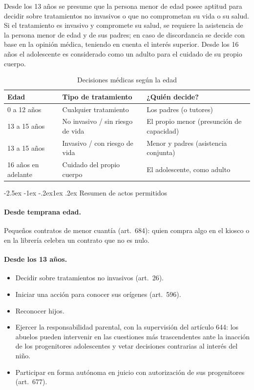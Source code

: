 \documentclass[12pt,oneside]{book}
\makeatletter
\renewcommand\subsection{\@startsection{subsection}{2}{\z@}%
  {-2.5ex \@plus -1ex \@minus -.2ex}{1ex \@plus .2ex}%
  {\normalfont\normalsize\bfseries}}
\makeatother
\begin{document}
\begin{regla}
Desde los 13 años se presume que la persona menor de edad posee aptitud para decidir sobre tratamientos no invasivos o que no comprometan su vida o su salud. Si el tratamiento es invasivo y compromete su salud, se requiere la asistencia de la persona menor de edad y de sus padres; en caso de discordancia se decide con base en la opinión médica, teniendo en cuenta el interés superior. Desde los 16 años el adolescente es considerado como un adulto para el cuidado de su propio cuerpo.
\end{regla}

\begin{table}[H]
\centering
\begin{tabularx}{\textwidth}{B{0.20\textwidth} Y Y}
\toprule
\textbf{Edad} & \textbf{Tipo de tratamiento} & \textbf{¿Quién decide?} \\
 a 12 años & Cualquier tratamiento & Los padres (o tutores) \\
13 a 15 años & No invasivo / sin riesgo de vida & El propio menor (presunción de capacidad) \\
13 a 15 años & Invasivo / con riesgo de vida & Menor y padres (asistencia conjunta) \\
16 años en adelante & Cuidado del propio cuerpo & El adolescente, como adulto \\
\bottomrule
\end{tabularx}
\caption{Decisiones médicas según la edad}
\end{table}

\subsection{Resumen de actos permitidos}

\paragraph{Desde temprana edad.} Pequeños contratos de menor cuantía (art.~684): quien compra algo en el kiosco o en la librería celebra un contrato que no es nulo.

\paragraph{Desde los 13 años.}

\begin{itemize}
\item Decidir sobre tratamientos no invasivos (art.~26).
\item Iniciar una acción para conocer sus orígenes (art.~596).
\item Reconocer hijos.
\item Ejercer la responsabilidad parental, con la supervisión del artículo 644: los abuelos pueden intervenir en las cuestiones más trascendentes ante la inacción de los progenitores adolescentes y vetar decisiones contrarias al interés del niño.
\item Participar en forma autónoma en juicio con autorización de sus progenitores (art.~677).
\end{itemize}
\end{document}
